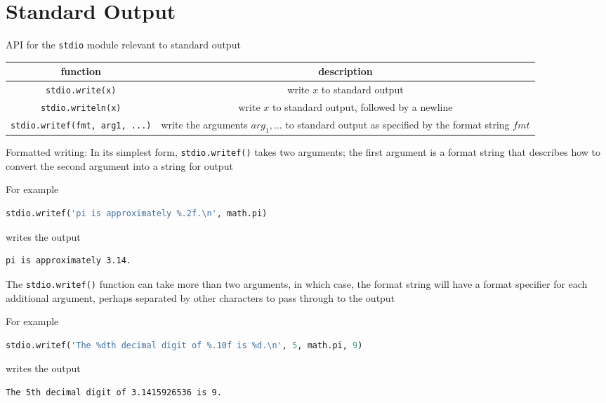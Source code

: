 \documentclass[8pt,a4paper,compress]{beamer}
\begin{document}
\section{Standard Output}
\begin{frame}[fragile]
\pause

API for the \lstinline{stdio} module relevant to standard output
\begin{center}
\begin{tabular}{cc}
function & description \\ \hline
\lstinline$stdio.write(x)$ & write $x$ to standard output \\
\lstinline$stdio.writeln(x)$ & write $x$ to standard output, followed by a newline \\
\lstinline$stdio.writef(fmt, arg1, ...)$ & \makecell{write the arguments $arg_1, \dots$ to standard output \\ as specified by the format string $fmt$} \\
\end{tabular} 
\end{center}

\pause
\bigskip

Formatted writing: In its simplest form, \lstinline{stdio.writef()} takes two arguments; the first argument is a format string that describes how to convert the second argument into a string for output

\pause
\bigskip

For example
\begin{lstlisting}[language=Python]
stdio.writef('pi is approximately %.2f.\n', math.pi)
\end{lstlisting}
writes the output
\begin{lstlisting}[language={}]
pi is approximately 3.14.
\end{lstlisting}

\pause
\bigskip

The \lstinline{stdio.writef()} function can take more than two arguments, in which case, the format string will have a format specifier for each additional argument, perhaps separated by other characters to pass through to the output

\pause
\bigskip

For example
\begin{lstlisting}[language=Python]
stdio.writef('The %dth decimal digit of %.10f is %d.\n', 5, math.pi, 9)
\end{lstlisting}
writes the output
\begin{lstlisting}[language={}]
The 5th decimal digit of 3.1415926536 is 9.
\end{lstlisting}
\end{frame}
\end{document}
